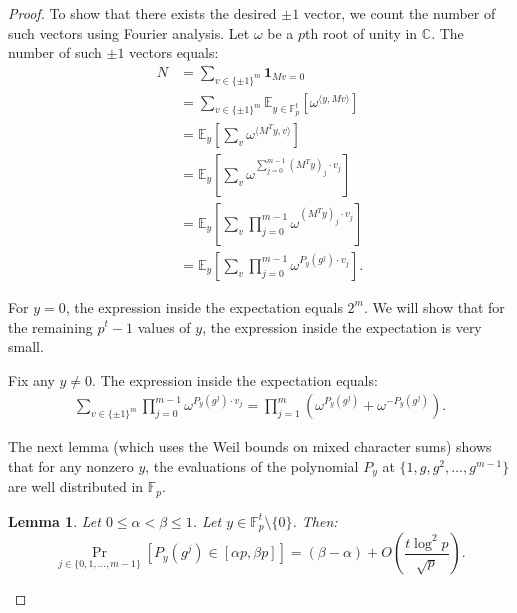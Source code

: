 \documentclass[10pt,a4paper]{article}
\newtheorem{lemma}[theorem]{Lemma}
\newcommand{\F}{\mathbb{F}}
\newcommand{\one}{{\mathbf{1}}}
\begin{document}
\begin{proof}
 To show that there exists the desired $\pm 1$ vector, we count the number of such vectors using Fourier analysis. Let $\omega$ be a $p$th root of unity in $\mathbb C$. The number of such $\pm 1$ vectors equals:
 \begin{align*}
 N &= \sum_{v \in \{\pm 1\}^m } \one_{M v = 0}\\
 &= \sum_{v \in \{\pm 1\}^m }  \mathbb E_{y \in \F_p^t}  \left[ \omega^{\langle y, Mv \rangle} \right]  \\
 &= \mathbb E_y \left[ \sum_v  \omega^{\langle M^T y, v \rangle}   \right]\\
 &= \mathbb E_y \left[ \sum_v  \omega^{\sum_{j=0}^{m-1} (M^T y)_j \cdot  v_j}   \right]\\
 &= \mathbb E_y \left[ \sum_v   \prod_{j=0}^{m-1} \omega^{(M^T y)_j \cdot  v_j}   \right]\\
 &= \mathbb E_y \left[ \sum_v \prod_{j=0}^{m-1} \omega^{P_y(g^{j}) \cdot  v_j} \right].
 \end{align*}
 

For $y = 0$, the expression inside the expectation equals $2^m$.
We will show that for the remaining $p^t -1$ values of $y$,
the expression inside the expectation is very small. 

Fix any $y \neq 0$. 
The expression inside the expectation equals:
\begin{align}
 \label{weilval}
\sum_{v \in \{\pm 1\}^m} \prod_{j=0}^{m-1} \omega^{P_y(g^{j}) \cdot  v_j} = \prod_{j=1}^m \left(\omega^{P_y(g^{j})} + \omega^{-P_y(g^{j})} \right).
\end{align}

The next lemma (which uses the Weil bounds on mixed character sums) shows that for any nonzero $y$, the evaluations of the polynomial $P_y$ at $\{1, g, g^2, \ldots, g^{m-1}\}$ are well distributed in $\F_p$.
\begin{lemma}
\label{lem:equidist}
Let $0 \leq \alpha <  \beta \leq 1$.
 Let $y \in \F_p^t \setminus \{0\}$. Then:
 $$ \Pr_{j \in \{0,1, \ldots, m-1\}}\left[ P_y(g^j) \in [\alpha p, \beta p] \right] = (\beta - \alpha )  + O\left(\frac{t\log^2 p}{\sqrt{p}} \right).$$
\end{lemma}


\end{proof}
\end{document}
